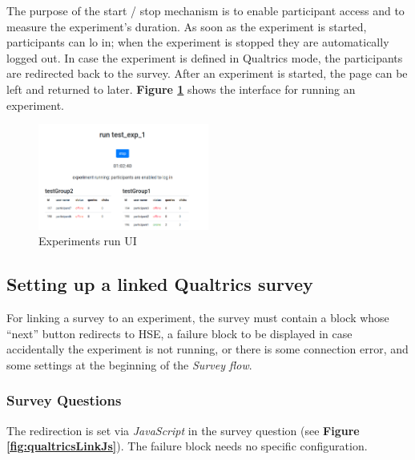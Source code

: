 \documentclass[a4paper]{usiinfbachelorproject}
\begin{document}
\begin{appendices}
        The purpose of the start / stop mechanism is to enable participant access and to measure the experiment's duration. As
        soon as the experiment is started, participants can lo in; when the experiment is stopped they are automatically logged out.
        In case the experiment is defined in Qualtrics mode, the participants are redirected back to the survey.
        After an experiment is started, the page can be left and returned to later.
        \textbf{Figure \ref{fig:expRunUi}} shows the interface for running an experiment.

        \begin{figure} [h]
        \centering
        \includegraphics[width=0.5\textwidth]{figures/expRunUi}
        \caption[]{Experiments run UI}
        \label{fig:expRunUi}
        \end{figure}

        \subsection{Setting up a linked Qualtrics survey}

        For linking a survey to an experiment, the survey must contain
        a block whose ``next'' button redirects to HSE, a failure block to be displayed in case accidentally the experiment is not running, or
        there is some connection error,
        and some settings at the beginning of the \emph{Survey flow}. 

        \subsubsection{Survey Questions}

        The redirection is set via \emph{JavaScript} in the survey question (see
        \textbf{Figure \ref{fig:qualtricsLinkJs}}). The failure block needs no specific configuration.


\end{appendices}
\end{document}
